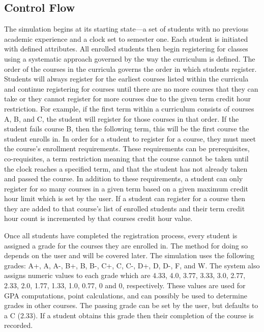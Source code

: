 \documentclass[botnum, fleqn]{unmeethesis}
\begin{document}
    \subsection{Control Flow}
    The simulation begins at its starting state---a set of students with no previous academic experience and a clock set to semester one. Each student is initiated with defined attributes. All enrolled students then begin registering for classes using a systematic approach governed by the way the curriculum is defined. The order of the courses in the curricula governs the order in which students register. Students will always register for the earliest courses listed within the curricula and continue registering for courses until there are no more courses that they can take or they cannot register for more courses due to the given term credit hour restriction. For example, if the first term within a curriculum consists of courses A, B, and C, the student will register for those courses in that order. If the student fails course B, then the following term, this will be the first course the student enrolls in. In order for a student to register for a course, they must meet the course's enrollment requirements. These requirements can be prerequisites, co-requisites, a term restriction meaning that the course cannot be taken until the clock reaches a specified term, and that the student has not already taken and passed the course. In addition to these requirements, a student can only register for so many courses in a given term based on a given maximum credit hour limit which is set by the user. If a student can register for a course then they are added to that course's list of enrolled students and their term credit hour count is incremented by that courses credit hour value. 

    Once all students have completed the registration process, every student is assigned a grade for the courses they are enrolled in. The method for doing so depends on the user and will be covered later. The simulation uses the following grades: A+, A, A-, B+, B, B-, C+, C, C-, D+, D, D-, F, and W. The system also assigns numeric values to each grade which are 4.33, 4.0, 3.77, 3.33, 3.0, 2.77, 2.33, 2.0, 1.77, 1.33, 1.0, 0.77, 0 and 0, respectively. These values are used for GPA computations, point calculations, and can possibly be used to determine grades in other courses. The passing grade can be set by the user, but defaults to a C (2.33). If a student obtains this grade then their completion of the course is recorded.
\end{document}
